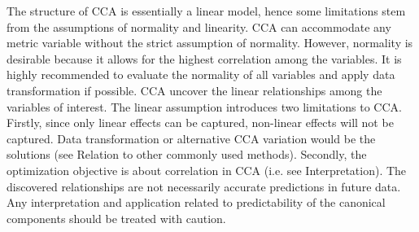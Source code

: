 The structure of CCA is essentially a linear model, hence some limitations stem from the assumptions of normality and linearity. CCA can accommodate any metric variable without the strict assumption of normality. However, normality is desirable because it allows for the highest correlation among the variables. It is highly recommended to evaluate the normality of all variables and apply data transformation if possible. CCA uncover the linear relationships among the variables of interest. The linear assumption introduces two limitations to CCA. Firstly, since only linear effects can be captured, non-linear effects will not be captured. Data transformation or alternative CCA variation would be the solutions (see Relation to other commonly used methods). Secondly, the optimization objective is about correlation in CCA (i.e. see Interpretation). The discovered relationships are not necessarily accurate predictions in future data. Any interpretation and application related to predictability of the canonical components should be treated with caution. 
\newpage
